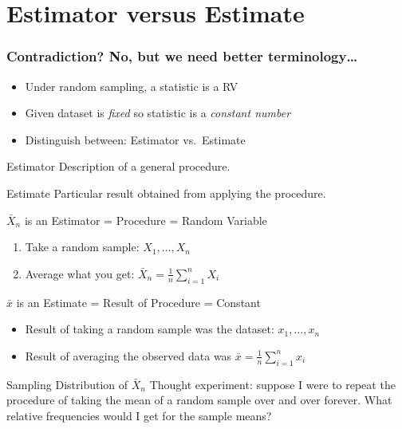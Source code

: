 \documentclass[handout]{beamer}
\begin{document}
\section{Estimator versus Estimate}
\begin{frame}
  \frametitle{Contradiction? No, but we need better terminology\dots}
  \begin{itemize}
    \item Under random sampling, a statistic is a RV
    \item Given dataset is \emph{fixed} so statistic is a \emph{constant number}
    \item Distinguish between: \alert{Estimator} vs.\ \alert{Estimate}
  \end{itemize}

  \begin{alertblock}{Estimator}
   Description of a general procedure. 
  \end{alertblock}
  \begin{alertblock}{Estimate}
    Particular result obtained from applying the procedure.
  \end{alertblock}
\end{frame}
\begin{frame}
  \begin{block}{$\bar{X}_n$ is an Estimator = Procedure = Random Variable}
\begin{enumerate}
\item Take a random sample: $X_1, \hdots, X_n \quad$ 
\item Average what you get: $\bar{X}_n = \frac{1}{n}\sum_{i=1}^n X_i\quad$ 
\end{enumerate}
\end{block}

\pause
\begin{block}{$\bar{x}$ is an Estimate = Result of Procedure = Constant}
 \begin{itemize}
\item Result of taking a random sample was the dataset: $x_1, \hdots, x_n$ 
\item Result of averaging the observed data was $\bar{x} = \frac{1}{n}\sum_{i=1}^n x_i$ 
\end{itemize}
\end{block}

\pause
\begin{block}{Sampling Distribution of $\bar{X}_n$}
  \alert{Thought experiment:} suppose I were to repeat the procedure of taking the mean of a random sample over and over \alert{forever}. What \alert{relative frequencies} would I get for the sample means?
\end{block}

\end{frame}
\end{document}
